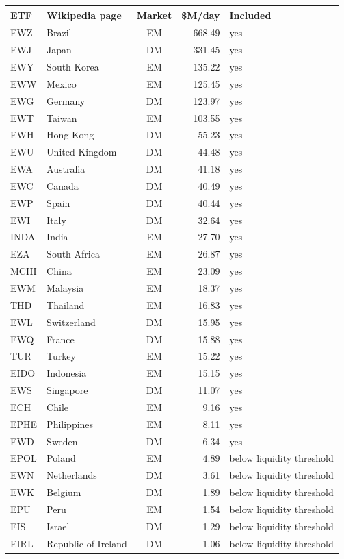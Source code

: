 \begin{tabular}{llcrl}
\toprule
ETF & Wikipedia page & Market & \$M/day & Included \\
\midrule
EWZ & Brazil & EM & 668.49 & yes \\
EWJ & Japan & DM & 331.45 & yes \\
EWY & South Korea & EM & 135.22 & yes \\
EWW & Mexico & EM & 125.45 & yes \\
EWG & Germany & DM & 123.97 & yes \\
EWT & Taiwan & EM & 103.55 & yes \\
EWH & Hong Kong & DM & 55.23 & yes \\
EWU & United Kingdom & DM & 44.48 & yes \\
EWA & Australia & DM & 41.18 & yes \\
EWC & Canada & DM & 40.49 & yes \\
EWP & Spain & DM & 40.44 & yes \\
EWI & Italy & DM & 32.64 & yes \\
INDA & India & EM & 27.70 & yes \\
EZA & South Africa & EM & 26.87 & yes \\
MCHI & China & EM & 23.09 & yes \\
EWM & Malaysia & EM & 18.37 & yes \\
THD & Thailand & EM & 16.83 & yes \\
EWL & Switzerland & DM & 15.95 & yes \\
EWQ & France & DM & 15.88 & yes \\
TUR & Turkey & EM & 15.22 & yes \\
EIDO & Indonesia & EM & 15.15 & yes \\
EWS & Singapore & DM & 11.07 & yes \\
ECH & Chile & EM & 9.16 & yes \\
EPHE & Philippines & EM & 8.11 & yes \\
EWD & Sweden & DM & 6.34 & yes \\
EPOL & Poland & EM & 4.89 & below liquidity threshold \\
EWN & Netherlands & DM & 3.61 & below liquidity threshold \\
EWK & Belgium & DM & 1.89 & below liquidity threshold \\
EPU & Peru & EM & 1.54 & below liquidity threshold \\
EIS & Israel & DM & 1.29 & below liquidity threshold \\
EIRL & Republic of Ireland & DM & 1.06 & below liquidity threshold \\

\end{tabular}
